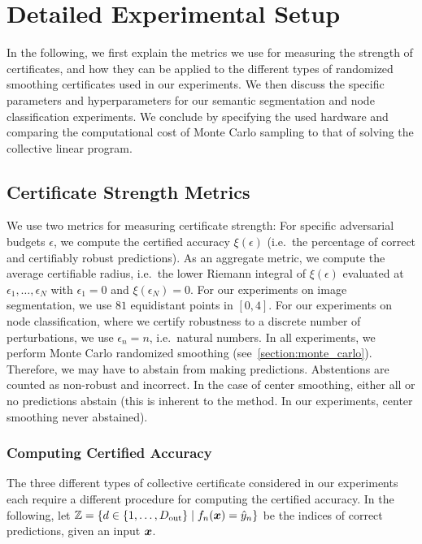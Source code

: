 \null
\vfill

\clearpage

\section{Detailed Experimental Setup}\label{section:detailed_exp_setup}



In the following, we first explain the metrics we use for measuring the strength of certificates, and how they can be applied to the different types of randomized smoothing certificates used in our experiments.
We then discuss the specific parameters and hyperparameters for our semantic segmentation and node classification experiments.
We conclude by specifying the used hardware and comparing the computational cost of Monte Carlo sampling to that of solving the collective linear program.

\subsection{Certificate Strength Metrics}\label{section:metrics}
We use two metrics for measuring certificate strength: For specific adversarial budgets $\epsilon$, we compute the certified accuracy $\xi(\epsilon)$ (i.e.~the percentage of correct and certifiably robust predictions).
As an aggregate metric, we compute the average certifiable radius, i.e.~the lower Riemann integral of $\xi(\epsilon)$ evaluated at $\epsilon_1,\dots,\epsilon_N$ with $\epsilon_1=0$ and $\xi(\epsilon_N) = 0$.
For our experiments on image segmentation, we use $81$ equidistant points in $[0, 4]$. For our experiments on node classification, where we certify robustness to a discrete number of perturbations, we use $\epsilon_n = n$, i.e.~natural numbers.
In all experiments, we perform Monte Carlo randomized smoothing (see~\autoref{section:monte_carlo}). Therefore, we may have to abstain from making predictions. Abstentions are counted as non-robust and incorrect.
In the case of center smoothing, either all or no predictions abstain (this is inherent to the method. In our experiments, center smoothing never abstained).



\subsubsection{Computing Certified Accuracy}
The three different types of collective certificate considered in our experiments each require a different procedure for computing the certified accuracy.
In the following, let ${\mathbb{Z}} = \left\{d \in \{1,\dots,D_\mathrm{out}\} \mid f_n({\bm{x}}) = \hat{{y}}_n\right\}$ be the indices of correct predictions, given an input ${\bm{x}}$.


